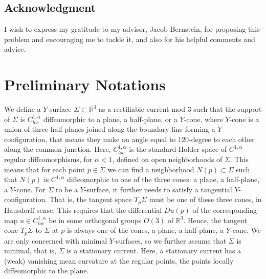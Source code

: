 \documentclass[10pt,a4paper]{amsart}
\theoremstyle{theorem}
\theoremstyle{definition}
\numberwithin{equation}{section}
\begin{document}
\subsection*{Acknowledgment}
I wish to express my gratitude to my advisor, Jacob Bernstein, for proposing this problem and encouraging me to tackle it, and also for his helpful comments and advice. 

\section{Preliminary Notations}
We define a $Y$-surface $\Sigma \subset \mathbb{R}^3$ as a rectifiable current mod 3 such that the support of $\Sigma$ is $C^{1,\alpha}_{loc}$ diffeomorphic to a plane, a half-plane, or a $Y$-cone, where $Y$-cone is a union of three half-planes joined along the boundary line forming a $Y$-configuration, that means they make an angle equal to 120-degree to each other along the common junction. Here, $C_{loc}^{1,\alpha}$ is the standard Holder space of $C^{1,\alpha}$-regular diffeomorphisms, for $\alpha <1$, defined on open neighborhoods of $\Sigma$. This means that for each point $p\in \Sigma$ we can find a neighborhood $N(p)\subset \Sigma$ such that $N(p)$ is $C^{1,\alpha}$ diffeomorphic to one of the three cones: a plane, a half-plane, a $Y$-cone. For $\Sigma$ to be a $Y$-surface, it further needs to satisfy a tangential $Y$-configuration. That is, the tangent space $T_p\Sigma$ must be one of these three cones, in Hausdorff sense. This requires that the differential $Du(p)$ of the corresponding map $u\in C_{loc}^{1,\alpha}$ be in some orthogonal groups $O(3)$ of $\mathbb{R}^3$. Hence, the tangent cone $T_p\Sigma$ to $\Sigma$ at $p$ is always one of the cones, a plane, a half-plane, a $Y$-cone. We are only concerned with minimal $Y$-surfaces, so we further assume that $\Sigma$ is minimal, that is, $\Sigma$ is a stationary current. Here, a stationary current has a (weak) vanishing mean curvature at the regular points, the points locally diffeomorphic to the plane. 
\medskip
\end{document}
